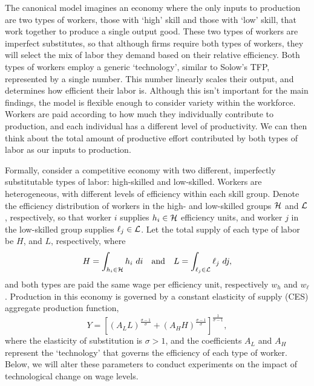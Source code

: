 The canonical model imagines an economy where the only inputs to production are two types of workers, those with `high' skill and those with `low' skill, that work together to produce a single output good. These two types of workers are imperfect substitutes, so that although firms require both types of workers, they will select the mix of labor they demand based on their relative efficiency. Both types of workers employ a generic `technology', similar to Solow's TFP, represented by a single number. This number linearly scales their output, and determines how efficient their labor is. Although this isn't important for the main findings, the model is flexible enough to consider variety within the workforce. Workers are paid according to how much they individually contribute to production, and each individual has a different level of productivity. We can then think about the total amount of productive effort contributed by both types of labor as our inputs to production.

Formally, consider a competitive economy with two different, imperfectly substitutable types of labor: high-skilled and low-skilled. Workers are heterogeneous, with different levels of efficiency within each skill group. Denote the efficiency distribution of workers in the high- and low-skilled groups $\mathcal{H}$ and $\mathcal{L}$, respectively, so that worker $i$ supplies $h_i\in\mathcal{H}$ efficiency units, and worker $j$ in the low-skilled group supplies $\ell_j\in\mathcal{L}$. Let the total supply of each type of labor be $H$, and $L$, respectively, where
$$
    H = \int_{h_i \in \sH} h_i\ di \quad\text{and}\quad L = \int_{\ell_j \in \sL} \ell_j\ dj,
$$
and both types are paid the same wage per efficiency unit, respectively $w_h$ and $w_\ell$. Production in this economy is governed by a constant elasticity of supply (CES) aggregate production function,
\begin{equation}  \label{eq:prod}
Y = \left[
  \left(A_LL \right)^\frac{\sigma-1}{\sigma}
  +
  \left(A_HH \right)^\frac{\sigma-1}{\sigma}
  \right]^\frac{1}{\sigma-1},
\end{equation}
where the elasticity of substitution is $\sigma>1$, and the coefficients $A_L$ and $A_H$ represent the `technology' that governs the efficiency of each type of worker. Below, we will alter these parameters to conduct experiments on the impact of technological change on wage levels.

